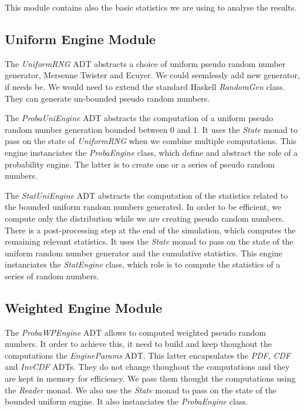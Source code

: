 \documentclass[12pt,a4paper,article]{memoir} %
\begin{document}
This module contains also the basic statistics we are using to 
analyse the results.

\subsection{Uniform Engine Module}

The \emph{UniformRNG} ADT abstracts a choice of uniform pseudo random 
number generator, Mersenne Twister and Ecuyer. We could seemlessly
add new generator, if needs be. We would need to extend the standard
Haskell \emph{RandomGen} class. 
They can generate un-bounded pseudo random numbers.

The \emph{ProbaUniEngine} ADT abstracts the computation of a uniform pseudo
random number generation bounded between 0 and 1.
It uses the \emph{State} monad to pass on the state of \emph{UniformRNG}
when we combine multiple computations.
This engine instanciates the \emph{ProbaEngine} class, which define
and abstract the role of a probability engine. The latter is to 
create one or a series of pseudo random numbers.

The \emph{StatUniEngine} ADT abstracts the computation of the statistics
related to the bounded uniform random numbers generated. 
In order to be efficient, we compute only the distribution while we 
are creating pseudo random numbers. 
There is a post-processing step at the end of the simulation, which 
computes the remaining relevant statistics.
It uses the \emph{State} monad to pass on the state of the 
uniform random number generator and the cumulative statistics.
This engine instanciates the \emph{StatEngine} class, which role is
to compute the statistics of a series of random numbers.

\subsection{Weighted Engine Module}

The \emph{ProbaWPEngine} ADT allows to computed weighted pseudo
random numbers. It order to achieve this, it need to build and keep
thoughout the computations the \emph{EngineParams} ADT. 
This latter encapsulates the \emph{PDF}, \emph{CDF} and \emph{InvCDF}
ADTs. They do not change thoughout the computations and they are kept 
in memory for efficiency. We pass them thought the computations
using the \emph{Reader} monad. We also use the \emph{State} monad
to pass on the state of the bounded uniform engine.
It also instanciates the \emph{ProbaEngine} class.
\end{document}
